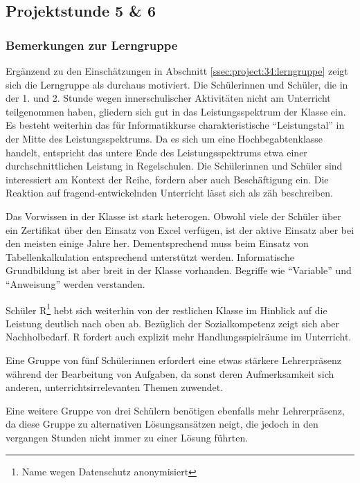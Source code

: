 \subsection{Projektstunde 5 \& 6}\steffen
\subsubsection{Bemerkungen zur Lerngruppe}
Ergänzend zu den Einschätzungen in Abschnitt \ref{ssec:project:34:lerngruppe} zeigt sich die Lerngruppe als durchaus motiviert. Die Schülerinnen und Schüler, die in der 1. und 2. Stunde wegen innerschulischer Aktivitäten nicht am Unterricht teilgenommen haben, gliedern sich gut in das Leistungsspektrum der Klasse ein. Es besteht weiterhin das für Informatikkurse charakteristische ``Leistungstal'' in der Mitte des Leistungsspektrums. Da es sich um eine Hochbegabtenklasse handelt, entspricht das untere Ende des Leistungsspektrums etwa einer durchschnittlichen Leistung in Regelschulen. Die Schülerinnen und Schüler sind interessiert am Kontext der Reihe, fordern aber auch Beschäftigung ein. Die Reaktion auf fragend-entwickelnden Unterricht lässt sich als zäh beschreiben. 

Das Vorwissen in der Klasse ist stark heterogen. Obwohl viele der Schüler über ein Zertifikat über den Einsatz von Excel verfügen, ist der aktive Einsatz aber bei den meisten einige Jahre her. Dementsprechend muss beim Einsatz von Tabellenkalkulation entsprechend unterstützt werden. Informatische Grundbildung ist aber breit in der Klasse vorhanden. Begriffe wie ``Variable'' und ``Anweisung'' werden verstanden. 

Schüler R\footnote{Name wegen Datenschutz anonymisiert} hebt sich weiterhin von der restlichen Klasse im Hinblick auf die Leistung deutlich nach oben ab. Bezüglich der Sozialkompetenz zeigt sich aber Nachholbedarf. R fordert auch explizit mehr Handlungsspielräume im Unterricht.

Eine Gruppe von fünf Schülerinnen erfordert eine etwas stärkere Lehrerpräsenz während der Bearbeitung von Aufgaben, da sonst deren Aufmerksamkeit sich anderen, unterrichtsirrelevanten Themen zuwendet. 

Eine weitere Gruppe von drei Schülern benötigen ebenfalls mehr Lehrerpräsenz, da diese Gruppe zu alternativen Lösungsansätzen neigt, die jedoch in den vergangen Stunden nicht immer zu einer Lösung führten.
